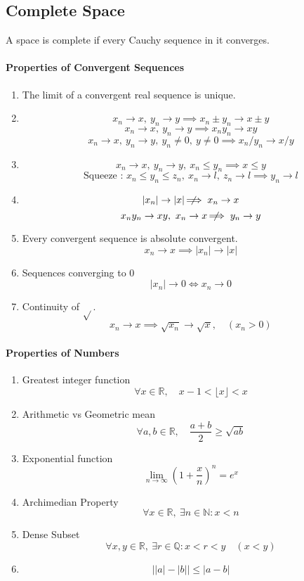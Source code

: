 \subsection{Complete Space}
\begin{definition}[complete]
	A space is complete if every Cauchy sequence in it converges.
\end{definition}

\paragraph{Properties of Convergent Sequences}
\begin{enumerate}
	\item The limit of a convergent real sequence is unique.
	\item 
		\[ x_n \to x,\ y_n \to y \implies x_n \pm y_n \to x \pm y \]
		\[ x_n \to x,\ y_n \to y \implies x_n y_n \to xy \]
		\[ x_n \to x,\ y_n \to y,\ y_n \ne 0,\ y \ne 0 \implies x_n/y_n \to x/y \]
	\item
		\[ x_n \to x,\ y_n \to y,\ x_n \le y_n \implies x \le y \]
		\[ \text{Squeeze : } x_n \le y_n \le z_n,\ x_n \to l,\ z_n \to l \implies y_n \to l \]
	\item 
		\[ |x_n| \to |x| \;\not\nobreak\!\!\!\!\implies x_n \to x \]
		\[ x_ny_n \to xy, \ x_n \to x \;\not\nobreak\!\!\!\!\implies y_n \to y \]
	\item Every convergent sequence is absolute convergent.
		\[ x_n \to x \implies |x_n| \to |x| \]
	\item Sequences converging to $0$
		\[ |x_n| \to 0 \iff x_n \to 0 \]
	\item Continuity of $\sqrt{}$.
		\[ x_n \to x \implies \sqrt{x_n} \to \sqrt{x}, \quad (x_n > 0) \]
\end{enumerate}

\paragraph{Properties of Numbers}
\begin{enumerate}
	\item Greatest integer function
		\[ \forall x \in \mathbb{R},\quad x-1 < \lfloor x \rfloor < x \] %
	\item Arithmetic vs Geometric mean
		\[ \forall a,b \in \mathbb{R},\quad \frac{a+b}{2} \ge \sqrt{ab} \]
	\item Exponential function
		\[ \lim_{n \to \infty} \left(1+\frac{x}{n}\right)^n = e^x \]
	\item Archimedian Property
		\[ \forall x \in \mathbb{R},\ \exists n \in \mathbb{N} : x < n \]
	\item Dense Subset
		\[ \forall x,y \in \mathbb{R},\ \exists r \in \mathbb{Q} : x < r < y \quad (x<y) \]
	\item 
		\[ \left| |a|-|b| \right|  \le |a-b| \]
\end{enumerate}

